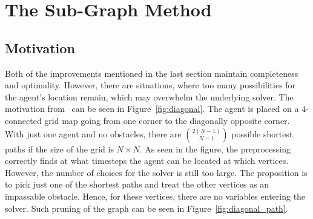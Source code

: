 \section{The Sub-Graph Method}
\label{sec:subgraph}

\subsection{Motivation}


Both of the improvements mentioned in the last section maintain completeness and optimality. However, there are situations, where too many possibilities for the agent's location remain, which may overwhelm the underlying solver. The motivation from~\cite{AAMAS_corridors} can be seen in Figure~\ref{fig:diagonal}. The agent is placed on a 4-connected grid map going from one corner to the diagonally opposite corner. With just one agent and no obstacles, there are $\binom{2(N-1)}{N-1}$ possible shortest paths if the size of the grid is $N \times N$. As seen in the figure, the preprocessing correctly finds at what timesteps the agent can be located at which vertices. However, the number of choices for the solver is still too large. The proposition is to pick just one of the shortest paths and treat the other vertices as an impassable obstacle. Hence, for these vertices, there are no variables entering the solver. Such pruning of the graph can be seen in Figure~\ref{fig:diagonal_path}.

